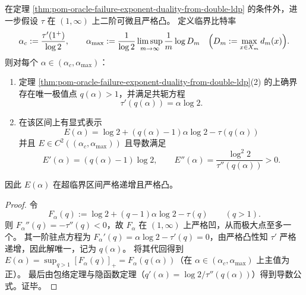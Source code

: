 \begin{theorem}\label{thm:pom-oracle-failure-thermo-conjugacy-smooth}
在定理 \ref{thm:pom-oracle-failure-exponent-duality-from-double-ldp} 的条件外，进一步假设 \(\tau\) 在 \((1,\infty)\) 上二阶可微且严格凸。
定义临界比特率
\[
\alpha_c:=\frac{\tau'(1^+)}{\log 2},
\qquad
\alpha_{\max}:=\frac{1}{\log 2}\limsup_{m\to\infty}\frac1m\log D_m
\quad\Bigl(D_m:=\max_{x\in X_m}d_m(x)\Bigr).
\]
则对每个 \(\alpha\in(\alpha_c,\alpha_{\max})\)：
\begin{enumerate}
  \item 定理 \ref{thm:pom-oracle-failure-exponent-duality-from-double-ldp}(2) 的上确界存在唯一极值点 \(q(\alpha)>1\)，并满足共轭方程
  \[
  \boxed{\;\tau'(q(\alpha))=\alpha\log 2.\;}
  \]
  \item 在该区间上有显式表示
  \[
  \boxed{\;
  E(\alpha)=\log 2+(q(\alpha)-1)\alpha\log 2-\tau(q(\alpha))\;}
  \]
  并且 \(E\in C^2((\alpha_c,\alpha_{\max}))\) 且导数满足
  \[
  E'(\alpha)=(q(\alpha)-1)\log 2,
  \qquad
  E''(\alpha)=\frac{\log^2 2}{\tau''(q(\alpha))}>0.
  \]
\end{enumerate}
因此 \(E(\alpha)\) 在超临界区间严格递增且严格凸。
\end{theorem}
\begin{proof}
令
\[
F_\alpha(q):=\log 2+(q-1)\alpha\log 2-\tau(q)\qquad(q>1).
\]
则 \(F_\alpha''(q)=-\tau''(q)<0\)，故 \(F_\alpha\) 在 \((1,\infty)\) 上严格凹，从而极大点至多一个。
其一阶驻点方程为 \(F_\alpha'(q)=\alpha\log 2-\tau'(q)=0\)，由严格凸性知 \(\tau'\) 严格递增，因此解唯一，记为 \(q(\alpha)\)。
将其代回得到 \(E(\alpha)=\sup_{q>1}[F_\alpha(q)]_+=F_\alpha(q(\alpha))\)（在 \(\alpha\in(\alpha_c,\alpha_{\max})\) 上主值为正）。
最后由包络定理与隐函数定理（\(q'(\alpha)=\log 2/\tau''(q(\alpha))\)）得到导数公式。证毕。
\end{proof}

